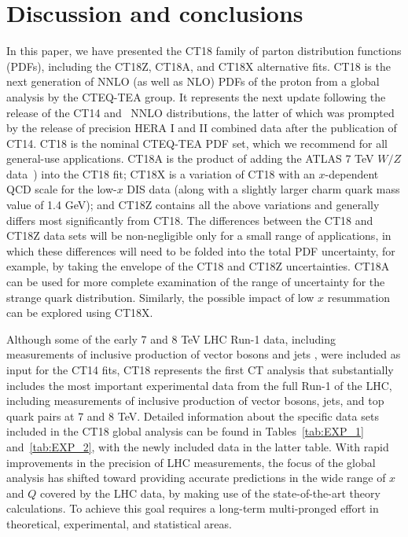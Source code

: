 \section{Discussion and conclusions
\label{sec:Conclusions}
}

In this paper, we have presented the CT18 family of parton distribution functions (PDFs), including the CT18Z, CT18A, and CT18X alternative fits. CT18 is the next generation of NNLO (as well as NLO)
PDFs of the proton from a global analysis by the CTEQ-TEA group. It represents the next update following the release of the CT14 and \CTHERAII~NNLO distributions, the latter of which was prompted
by the release of precision HERA I and II combined data after the publication of CT14. 
CT18 is the nominal CTEQ-TEA PDF set, which we recommend for all general-use applications.  CT18A is the product of adding the ATLAS 7 TeV $W/Z$ data~\cite{Aaboud:2016btc})
into the CT18 fit; CT18X is a variation of CT18 with an $x$-dependent QCD scale for the low-$x$ DIS data (along with a slightly larger charm quark mass value of 1.4 GeV);
and CT18Z contains all the above variations and generally differs most significantly from CT18. The differences between  the CT18 and CT18Z data sets will be non-negligible only for a small range of applications, in which these differences will need to be folded into the total PDF uncertainty, for example, by taking the envelope of the CT18 and CT18Z uncertainties.  CT18A can be used for  more complete examination of the range of uncertainty for the strange quark distribution. Similarly, the possible impact of low $x$ resummation can be explored using CT18X.

Although some of the early 7 and 8 TeV LHC Run-1 data, including measurements of inclusive production of vector bosons
\cite{Aaij:2012vn, Chatrchyan:2013mza, Chatrchyan:2012xt, Aad:2011dm} and jets \cite{Aad:2011fc, Chatrchyan:2012bja}, were included as input for the CT14 fits, CT18 represents the first CT analysis that
substantially includes the most important experimental data from the full Run-1 of the LHC, including measurements of inclusive production of vector bosons, jets, and top quark pairs at 7 and 8 TeV.
Detailed information about the specific data sets included in the CT18 global analysis can be found in Tables~\ref{tab:EXP_1} and~\ref{tab:EXP_2}, with the newly included data in the latter table.
With rapid improvements in the precision of LHC measurements, the focus of the global analysis has shifted toward providing accurate predictions in the wide range of $x$ and $Q$ covered by the LHC data, by making use of the state-of-the-art theory calculations. To achieve this goal requires a long-term multi-pronged effort in
theoretical, experimental, and statistical areas.

